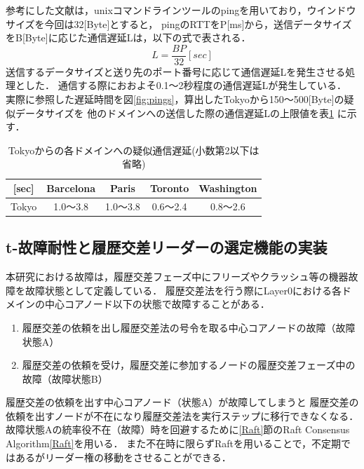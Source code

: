 \documentclass[a4paper,12pt]{jsarticle}
\begin{document}
参考にした文献\cite{pings}は，unixコマンドラインツールのpingを用いており，ウインドウサイズを今回は$32$[Byte]とすると，
pingのRTTをP[ms]から，送信データサイズをB[Byte]に応じた通信遅延Lは，以下の式で表される．
\begin{equation}
  \label{byt}
    L = \frac{BP}{32} [sec]
\end{equation}
送信するデータサイズと送り先のポート番号に応じて通信遅延Lを発生させる処理とした．
通信する際におおよそ0.1〜2秒程度の通信遅延Lが発生している．
実際に参照した遅延時間を図\ref{fig:pings}，算出したTokyoから150〜500[Byte]の疑似データサイズを
他のドメインへの送信した際の通信遅延Lの上限値を表\ref{Byte} に示す．

\begin{table}[H]%
  \centering
  \caption{Tokyoからの各ドメインへの疑似通信遅延(小数第2以下は省略)}
  \label{Byte}
  \begin{tabular}{c|c|c|c|c|}
  \cline{2-5}
  [sec]                       & Barcelona &    Paris   &   Toronto  & Washington \\ \hline
  \multicolumn{1}{|c|}{Tokyo} &  1.0〜3.8 &  1.0〜3.8  &  0.6〜2.4  &  0.8〜2.6  \\ \hline
  \end{tabular}
\end{table}

\subsection{t-故障耐性と履歴交差リーダーの選定機能の実装}
本研究における故障は，履歴交差フェーズ中にフリーズやクラッシュ等の機器故障を故障状態として定義している．
履歴交差法を行う際にLayer0における各ドメインの中心コアノード以下の状態で故障することがある．

\begin{enumerate}
  \item 履歴交差の依頼を出し履歴交差法の号令を取る中心コアノードの故障（故障状態A）\\
  \hspace{12mm} 
  \item 履歴交差の依頼を受け，履歴交差に参加するノードの履歴交差フェーズ中の故障（故障状態B）\\
  \hspace{12mm} 
\end{enumerate}

履歴交差の依頼を出す中心コアノード（状態A）が故障してしまうと
履歴交差の依頼を出すノードが不在になり履歴交差法を実行ステップに移行できなくなる．
故障状態Aの統率役不在（故障）時を回避するために\ref{Raft}節のRaft Consensus Algorithm\ref{Raft}を用いる．
また不在時に限らずRaftを用いることで，不定期ではあるがリーダー権の移動をさせることができる．
\end{document}
